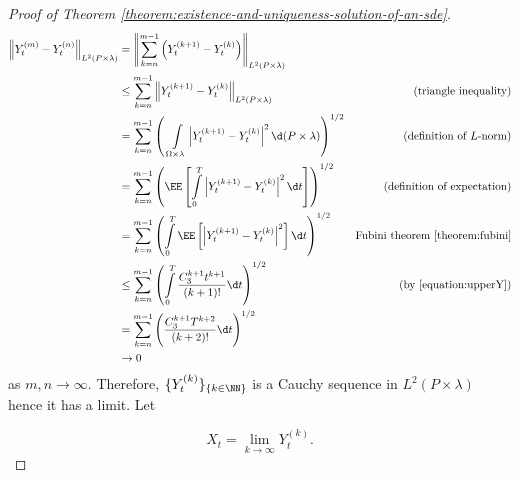\begin{proof}[Proof of Theorem \ref{theorem:existence-and-uniqueness-solution-of-an-sde}]
    \begin{align*}
        \left\|Y_t^{(m)}-Y_t^{(n)}\right\|_{L^2(P\times\lambda)}
         & =\left\|\sum\limits_{k=n}^{m-1} \left(Y_t^{(k+1)}-Y_t^{(k)}\right)\right\|_{L^2(P\times\lambda)}                                           &                                            \\
         & \le \sum\limits_{k=n}^{m-1} \left\|Y_t^{(k+1)}-Y_t^{(k)}\right\|_{L^2(P\times\lambda)}                                                     & \text{(triangle inequality)}               \\
         & = \sum\limits_{k=n}^{m-1}\left(\,\,\int\limits_{\Omega\times\lambda} \left|Y_t^{(k+1)}-Y_t^{(k)}\right|^2\d (P\times \lambda)\right)^{1/2} & \text{(definition of $L$-norm)}            \\
         & = \sum\limits_{k=n}^{m-1} \left(\EE\left[\int\limits_0^T\left|Y_t^{(k+1)}-Y_t^{(k)}\right|^2\d t\right]\right)^{1/2}                       & \text{(definition of expectation)}         \\
         & = \sum\limits_{k=n}^{m-1}  \left(\int\limits_0^T\EE\left[\left|Y_t^{(k+1)}-Y_t^{(k)}\right|^2\right]\d t\right)^{1/2}                      & \text{Fubini theorem \ref{theorem:fubini}} \\
         & \le \sum\limits_{k=n}^{m-1}  \left(\int\limits_0^T\dfrac{C_3^{k+1}t^{k+1}}{(k+1)!}\d t\right)^{1/2}                                        & \text{(by \ref{equation:upperY})}          \\
         & = \sum\limits_{k=n}^{m-1}\left(\dfrac{C_3^{k+1}T^{k+2}}{(k+2)!}\d t\right)^{1/2}                                                           &                                            \\
         & \to 0
    \end{align*}
    as $m,n\to\infty$. Therefore, $\{Y_t^{(k)}\}_{\{k\in\NN\}}$ is a Cauchy sequence in $L^2(P\times\lambda)$ hence it has a limit. Let

    $$X_t=\lim\limits_{k\to\infty}Y_t^{(k)}.$$


\end{proof}
